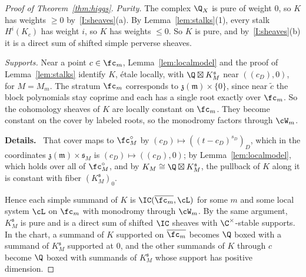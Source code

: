 \documentclass[11pt]{amsart}
\newenvironment{details}{\par\color{black!60!green}\noindent\textbf{Details.}\ }{\par}
\begin{document}
\begin{proof}[Proof of Theorem~\ref{thm:higgs}]
\emph{Purity.}  The complex $\Q_X$ is pure of weight $0$, so $K$ has weights
$\ge0$ by~\ref{I:sheaves}(a).  By Lemma~\ref{lem:stalks}(1), every stalk
$H^i(K_c)$ has weight $i$, so $K$ has weights $\le0$.  So $K$ is pure,
and by~\ref{I:sheaves}(b) it is a direct sum of shifted simple perverse
sheaves.

\emph{Supports.}  Near a point $c\in\fc_m$, Lemma~\ref{lem:localmodel} and
the proof of Lemma~\ref{lem:stalks} identify $K$, \'etale locally, with
$\Q\boxtimes K^{\mathfrak s}_M$ near $((c_D),0)$, for $M=M_m$.  The stratum $\fc_m$
corresponds to $\mathfrak z(\mathfrak m)\times\{0\}$, since near $\tilde c$
the block polynomials stay coprime and each has a single root exactly over
$\fc_m$.  So the cohomology sheaves of $K$ are locally constant on $\fc_m$.
They become constant on the cover by labeled roots, so the monodromy factors
through $\cW_m$.
\begin{details}
That cover maps
to $\fc^\circ_M$ by $(c_D)\mapsto((t-c_D)^{s_D})_D$, which in the coordinates
$\mathfrak z(\mathfrak m)\times\mathfrak s_M$ is $(c_D)\mapsto((c_D),0)$; by
Lemma~\ref{lem:localmodel}, which holds over all of $\fc^\circ_M$, and by
$K_M\cong\Q\boxtimes K^{\mathfrak s}_M$, the pullback of $K$ along it is
constant with fiber $(K^{\mathfrak s}_M)_0$.
\end{details}
Hence each simple summand of $K$ is
$\IC(\overline{\fc_m},\cL)$ for some $m$ and some local system $\cL$ on $\fc_m$
with monodromy through $\cW_m$.  By the same argument, $K^{\mathfrak s}_M$ is pure and
is a direct sum of shifted $\IC$ sheaves with $\C^\times$-stable supports.  In
the chart, a summand of $K$ supported on $\overline{\fc_m}$
becomes $\Q$ boxed with a summand of $K^{\mathfrak s}_M$ supported at $0$, and the other
summands of $K$ through $c$ become $\Q$ boxed with summands of $K^{\mathfrak s}_M$ whose
support has positive dimension.


\end{proof}
\end{document}
